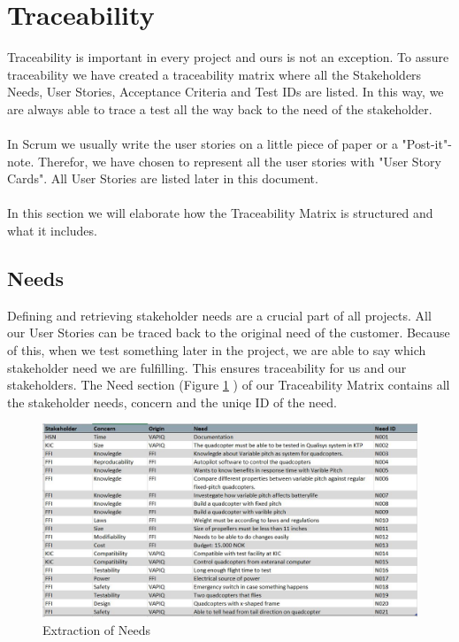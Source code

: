 \section{Traceability}
Traceability is important in every project and ours is not an exception. To assure traceability we have created a traceability matrix where all the Stakeholders Needs, User Stories, Acceptance Criteria and Test IDs are listed. In this way, we are always able to trace a test all the way back to the need of the stakeholder. \\
\\
In Scrum we usually write the user stories on a little piece of paper or a "Post-it"-note. Therefor, we have chosen to represent all the user stories with "User Story Cards". All User Stories are listed later in this document.  \\
\\
In this section we will elaborate how the Traceability Matrix is structured and what it includes.

\subsection{Needs}
Defining and retrieving stakeholder needs are a crucial part of all projects. All our User Stories can be traced back to the original need of the customer. Because of this, when we test something later in the project, we are able to say which stakeholder need we are fulfilling. This ensures traceability for us and our stakeholders. The Need section (Figure \ref{fig:needs} ) of our Traceability Matrix contains all the stakeholder needs, concern and the uniqe ID of the need. 

\begin{figure}[h]
    \centering
        \includegraphics[width = 1\textwidth]{VAPIQ-PICTURES/Needs}
    \caption{Extraction of Needs}
    \label{fig:needs}
\end{figure}
\newpage

